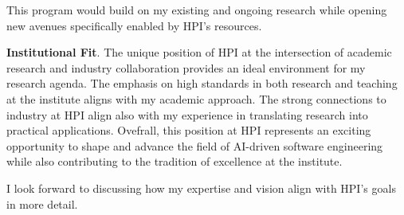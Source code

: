 This program would build on my existing and ongoing research while opening new avenues specifically enabled by HPI's resources.

\textbf{Institutional Fit}. 
The unique position of HPI at the intersection of academic research and industry collaboration provides an ideal environment for my research agenda. 
The emphasis on high standards in both research and teaching at the institute aligns with my academic approach.
The strong connections to industry at HPI align also with my experience in translating research into practical applications. 
Ovefrall, this position at HPI represents an exciting opportunity to shape and advance the field of AI-driven software engineering while also contributing to the tradition of excellence at the institute.

I look forward to discussing how my expertise and vision align with HPI's goals in more detail.
